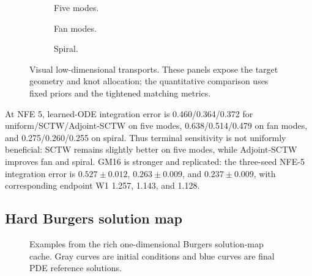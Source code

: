 \begin{figure}[t]
  \centering
  \begin{subfigure}{0.31\linewidth}
    \centering
    \caption{Five modes.}
  \end{subfigure}
  \begin{subfigure}{0.31\linewidth}
    \centering
    \caption{Fan modes.}
  \end{subfigure}
  \begin{subfigure}{0.31\linewidth}
    \centering
    \caption{Spiral.}
  \end{subfigure}
  \caption{Visual low-dimensional transports. These panels expose the target geometry and knot
  allocation; the quantitative comparison uses fixed priors and the tightened matching metrics.}
  \label{fig:lowdim-panels}
\end{figure}

\begin{table}[t]
  \centering
  \caption{GM16 endpoint W1, averaged over three independently trained checkpoints. Lower is
  better. The table reports both declared tempering powers and the post-hoc best fixed comparator.}
  \label{tab:gm16}
  \resizebox{\linewidth}{!}{%
  }
\end{table}

At NFE 5, learned-ODE integration error is 0.460/0.364/0.372 for
uniform/SCTW/Adjoint-SCTW on five modes, 0.638/0.514/0.479 on fan modes, and
0.275/0.260/0.255 on spiral. Thus terminal sensitivity is not uniformly beneficial: SCTW remains
slightly better on five modes, while Adjoint-SCTW improves fan and spiral. GM16 is stronger and
replicated: the three-seed NFE-5 integration error is
$0.527\pm0.012$, $0.263\pm0.009$, and $0.237\pm0.009$, with corresponding endpoint W1
1.257, 1.143, and 1.128.

\subsection{Hard Burgers solution map}
\label{sec:burgers-results}

\begin{figure}[t]
  \centering
  \caption{Examples from the rich one-dimensional Burgers solution-map cache. Gray curves are
  initial conditions and blue curves are final PDE reference solutions.}
  \label{fig:burgers-data}
\end{figure}

